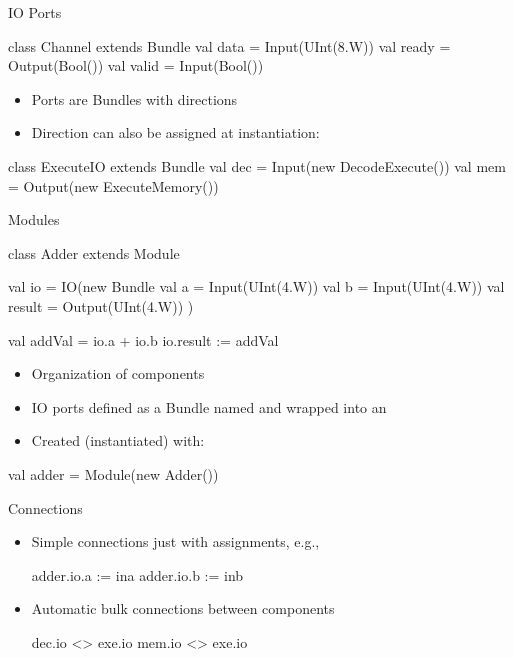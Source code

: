 \begin{frame}[fragile]{IO Ports}
\begin{chisel}
class Channel extends Bundle {
  val data = Input(UInt(8.W))
  val ready = Output(Bool())
  val valid = Input(Bool())
}
\end{chisel}
\begin{itemize}
\item Ports are Bundles with directions
\item Direction can also be assigned at instantiation:
\end{itemize}
\begin{chisel}
class ExecuteIO extends Bundle {
  val dec = Input(new DecodeExecute())
  val mem = Output(new ExecuteMemory())
}
\end{chisel}
\end{frame}

\begin{frame}[fragile]{Modules}
\begin{chisel}
class Adder extends Module {
  val io = IO(new Bundle {
    val a = Input(UInt(4.W))
    val b = Input(UInt(4.W))
    val result = Output(UInt(4.W))
  })

  val addVal = io.a + io.b
  io.result := addVal
}
\end{chisel}
\begin{itemize}
\item Organization of components
\item IO ports defined as a Bundle named  and wrapped into an 
\item Created (instantiated) with:
\end{itemize}
\begin{chisel}
val adder = Module(new Adder())
\end{chisel}
\end{frame}

\begin{frame}[fragile]{Connections}
\begin{itemize}
\item Simple connections just with assignments, e.g.,
\begin{chisel}
  adder.io.a := ina
  adder.io.b := inb
\end{chisel}
\item Automatic bulk connections between components
\begin{chisel}
  dec.io <> exe.io
  mem.io <> exe.io
\end{chisel}
\end{itemize}
\end{frame}

